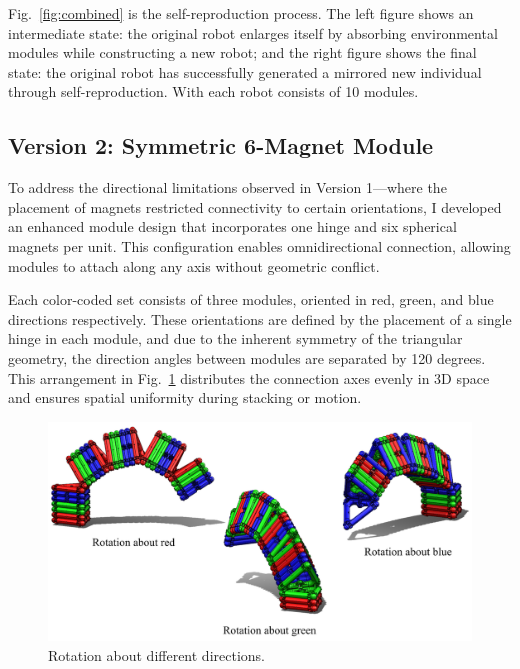 \documentclass[lettersize,journal]{IEEEtran}
\begin{document}
Fig.~\ref{fig:combined} is the self-reproduction process. The left figure shows an intermediate state: the original robot enlarges itself by absorbing environmental modules while constructing a new robot; and the right figure shows the final state: the original robot has successfully generated a mirrored new individual through self-reproduction. With each robot consists of 10 modules.

\subsection{Version 2: Symmetric 6-Magnet Module}

To address the directional limitations observed in Version 1—where the placement of magnets restricted connectivity to certain orientations, I developed an enhanced module design that incorporates one hinge and six spherical magnets per unit. This configuration enables omnidirectional connection, allowing modules to attach along any axis without geometric conflict.

Each color-coded set consists of three modules, oriented in red, green, and blue directions respectively. These orientations are defined by the placement of a single hinge in each module, and due to the inherent symmetry of the triangular geometry, the direction angles between modules are separated by 120 degrees. This arrangement in Fig.~\ref{fig:Rotation about Different Directions} distributes the connection axes evenly in 3D space and ensures spatial uniformity during stacking or motion.

\begin{figure}[H]
    \centering
    \includegraphics[width=1\linewidth]{Rotation about Different Directions.png}
    \caption{Rotation about different directions.}
    \label{fig:Rotation about Different Directions}
\end{figure}
\end{document}
